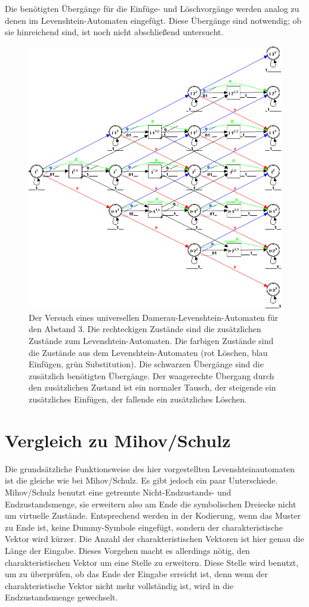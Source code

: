 Die benötigten Übergänge für die Einfüge- und Löschvorgänge werden analog zu denen im Levenshtein-Automaten eingefügt. Diese Übergänge sind notwendig; ob sie hinreichend sind, ist noch nicht abschließend untersucht.

\begin{figure}[htbp]
\centering
\includegraphics[width=\linewidth,height=\textheight,keepaspectratio]{pic/automata/unidamerau}%
\caption{Der Versuch eines universellen Damerau-Levenshtein-Automaten für den Abstand 3. Die rechteckigen Zustände sind die zusätzlichen Zustände zum Levenshtein-Automaten. Die farbigen Zustände sind die Zustände aus dem Levenshtein-Automaten (rot Löschen, blau Einfügen, grün Substitution). Die schwarzen Übergänge sind die zusätzlich benötigten Übergänge. Der waagerechte Übergang durch den zusätzlichen Zustand ist ein normaler Tausch, der steigende ein zusätzliches Einfügen, der fallende ein zusätzliches Löschen.}%
\end{figure}
\section{Vergleich zu Mihov/Schulz}
Die grundsätzliche Funktionsweise des hier vorgestellten Levenshteinautomaten ist die gleiche wie bei Mihov/Schulz. Es gibt jedoch ein paar Unterschiede. Mihov/Schulz benutzt eine getrennte Nicht-Endzustands- und Endzustandsmenge, sie erweitern also am Ende die symbolischen Dreiecke nicht um virtuelle Zustände. Entsprechend werden in der Kodierung, wenn das Muster zu Ende ist, keine Dummy-Symbole eingefügt, sondern der charakteristische Vektor wird kürzer. Die Anzahl der charakteristischen Vektoren ist hier genau die Länge der Eingabe. Dieses Vorgehen macht es allerdings nötig, den charakteristischen Vektor um eine Stelle zu erweitern. Diese Stelle wird benutzt, um zu überprüfen, ob das Ende der Eingabe erreicht ist, denn wenn der charakteristische Vektor nicht mehr vollständig ist, wird in die Endzustandsmenge gewechselt.

